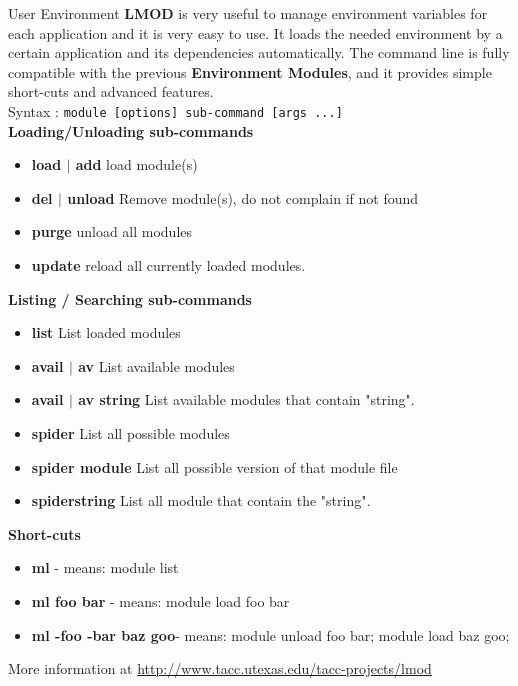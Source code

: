 \documentclass[final,t]{beamer}
\begin{document}
\begin{frame}[fragile]{}
\begin{columns}[t]
\begin{column}{.35\linewidth}
      \begin{block}{User Environment}
      \textbf{LMOD} is very useful to manage environment variables for each application and it is very easy to use. It loads the needed environment by a certain application and its dependencies automatically. The command line is fully compatible with the previous \textbf{Environment Modules}, and it provides simple short-cuts and advanced features.\\
      Syntax : \verb|module [options] sub-command [args ...]|\\
      \textbf{Loading/Unloading sub-commands}
        \begin{itemize}
        \item  \textbf{load $|$ add} load module(s)
        \item  \textbf{del $|$ unload} Remove module(s), do not complain if not found
        \item  \textbf{purge} unload all modules
        \item  \textbf{update} reload all currently loaded modules.
        \end{itemize}
       \textbf{Listing / Searching sub-commands}
        \begin{itemize}
        \item  \textbf{list} List loaded modules
        \item  \textbf{avail $|$ av} List available modules
        \item  \textbf{avail $|$ av string} List available modules that contain "string".
        \item  \textbf{spider} List all possible modules
        \item  \textbf{spider module} List all possible version of that module file
        \item  \textbf{spiderstring} List all module that contain the "string".
        \end{itemize}
       \textbf{Short-cuts}
       \begin{itemize}
        \item \textbf{ml} - means: module list
        \item \textbf{ml foo bar} - means: module load foo bar
        \item \textbf{ml -foo -bar baz goo}- means: module unload foo bar; module load baz goo;
        \end{itemize}
        More information at \url{http://www.tacc.utexas.edu/tacc-projects/lmod}
      \end{block}
      
    \end{column}
  \end{columns}
\end{frame}
\end{document}

